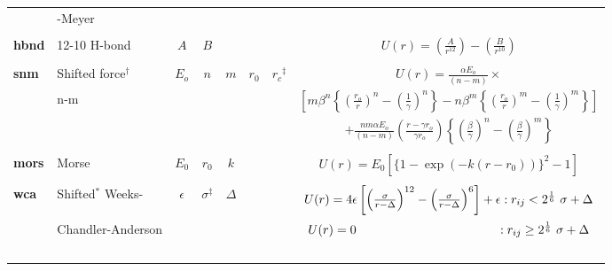 \begin{enumerate}
\begin{table}[htbp]
\begin{centering}
\begin{tabular}{|l|l|c|c|c|c|c|c|}
           & -Meyer                    &            &          &          &         &                      & \\
           &                           &            &          &          &         &                      & \\
{\bf hbnd} & 12-10 H-bond              & $A$        & $B$      &          &         &                      &
$U(r) = \left( \frac{A}{r^{12}} \right) - \left( \frac{B}{r^{10}} \right)$ \\
           &                           &            &          &          &         &                      & \\
{\bf snm}  & Shifted force$^{\dagger}$ & $E_{o}$    & $n$      & $m$      & $r_{0}$ & $r_{c}$$^{\ddagger}$ &
$U(r) = \frac{\alpha E_{o}}{(n-m)}\times$ \\
           & n-m \cite{mie-03a,clarke-86a} &        &          &          &         &                      &
$\left[ m\beta^{n} \left\{ \left( \frac{r_{o}}{r} \right)^{n} -
\left( \frac{1}{\gamma} \right)^{n} \right\} - n\beta^{m} \left\{
\left( \frac{r_{o}}{r} \right)^{m} - \left( \frac{1}{\gamma}
\right)^{m}\right\} \right]$ \\
           &                           &            &          &          &         &                      &
$+ \frac{nm\alpha E_{o}}{(n-m)} \left( \frac{r-\gamma r_{o}}
{\gamma r_{o}} \right) \left\{ \left( \frac{\beta}{\gamma}
\right)^{n} - \left( \frac{\beta}{\gamma} \right)^{m} \right\}$ \\
           &                           &            &          &          &         &                      & \\
{\bf mors} & Morse                     & $E_{0}$    & $r_{0}$  & $k$      &         &                      &
$U(r) = E_{0}[\{1-\exp(-k(r-r_{0}))\}^{2}-1]$ \\
           &                           &            &          &          &         &                      & \\
{\bf wca}  & Shifted$^{*}$ \cite{weeks-71a} Weeks- & $\epsilon$ & $\sigma^{\ddagger}$ & $\Delta$ & &       &
$U(r) = 4 \epsilon \left[ \left( \frac{\sigma}{r-\Delta} \right)^{12} -
\left( \frac{\sigma}{r-\Delta}\right)^{6} \right] + \epsilon : r_{ij} < 2^{1 \over 6}~\sigma + \Delta$ \\
           & Chandler-Anderson         &            &          &          &         &                      &
$U(r) = 0~~~~~~~~~~~~~~~~~~~~~~~~~~~~~~~~~~: r_{ij} \ge 2^{1 \over 6}~\sigma + \Delta$ \\
$$
\end{tabular}
\end{centering}
\end{table}
\end{enumerate}
